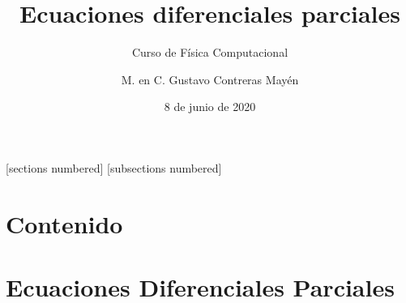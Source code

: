 


\normalfont
\usepackage{ccfonts}%
\usepackage[T1]{fontenc}%
\renewcommand{\rmdefault}{cmr}%
\newcommand{\funcionazul}[1]{\textcolor{blue}{\textbf{\texttt{#1}}}}
\linespread{1.3}
\title{Ecuaciones diferenciales parciales}
\subtitle{Curso de Física Computacional}
\author{M. en C. Gustavo Contreras Mayén}
\date{8 de junio de 2020}
[sections numbered]
[subsections numbered]
\newcommand{\seti}{\setcounter{saveenumi}{\value{enumi}}}
\newcommand{\conti}{\setcounter{enumi}{\value{saveenumi}}}

\maketitle
\fontsize{14}{14}\selectfont
{}
\section*{Contenido}
\section{Ecuaciones Diferenciales Parciales}
